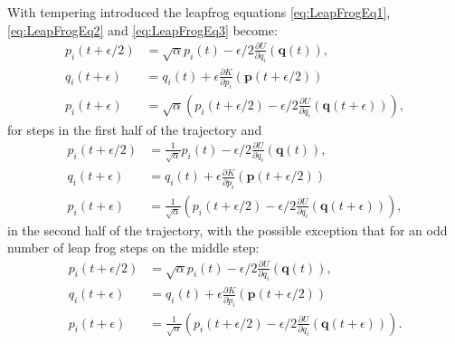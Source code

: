\documentclass[12pt]{article}
\begin{document}
    With tempering introduced the leapfrog equations \ref{eq:LeapFrogEq1}, \ref{eq:LeapFrogEq2} and \ref{eq:LeapFrogEq3} become:
    \begin{align}
        \label{eq:TLeapFrogEq1} p_i\left(t+\epsilon/2\right) & = \sqrt{\alpha}p_i\left(t\right) - \epsilon/2\frac{\partial U}{\partial q_i}\left(\bm{q}\left(t\right)\right), \\
        \label{eq:TLeapFrogEq2}q_i\left(t+\epsilon\right) & = q_i\left(t\right) + \epsilon\frac{\partial K}{\partial p_i}\left(\bm{p}\left(t+\epsilon/2\right)\right) \\
        \label{eq:TLeapFrogEq3}p_i\left(t+\epsilon\right) & = \sqrt{\alpha}\left(p_i\left(t+\epsilon/2\right) - \epsilon/2\frac{\partial U}{\partial q_i}\left(\bm{q}\left(t+\epsilon\right)\right)\right),
    \end{align}
    for steps in the first half of the trajectory and 
    \begin{align}
        p_i\left(t+\epsilon/2\right) & = \frac{1}{\sqrt{\alpha}}p_i\left(t\right) - \epsilon/2\frac{\partial U}{\partial q_i}\left(\bm{q}\left(t\right)\right), \\
        q_i\left(t+\epsilon\right) & = q_i\left(t\right) + \epsilon\frac{\partial K}{\partial p_i}\left(\bm{p}\left(t+\epsilon/2\right)\right) \\
        p_i\left(t+\epsilon\right) & = \frac{1}{\sqrt{\alpha}}\left(p_i\left(t+\epsilon/2\right) - \epsilon/2\frac{\partial U}{\partial q_i}\left(\bm{q}\left(t+\epsilon\right)\right)\right),
    \end{align}
    in the second half of the trajectory, with the possible exception that for an odd number of leap frog steps on the middle step:
    \begin{align}
         p_i\left(t+\epsilon/2\right) & = \sqrt{\alpha}p_i\left(t\right) - \epsilon/2\frac{\partial U}{\partial q_i}\left(\bm{q}\left(t\right)\right), \\
        q_i\left(t+\epsilon\right) & = q_i\left(t\right) + \epsilon\frac{\partial K}{\partial p_i}\left(\bm{p}\left(t+\epsilon/2\right)\right) \\
        p_i\left(t+\epsilon\right) & = \frac{1}{\sqrt{\alpha}}\left(p_i\left(t+\epsilon/2\right) - \epsilon/2\frac{\partial U}{\partial q_i}\left(\bm{q}\left(t+\epsilon\right)\right)\right).
    \end{align}
\end{document}
